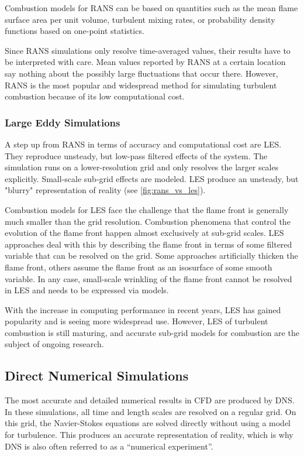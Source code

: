 %
Combustion models for \ac{RANS} can be based on quantities such as the mean
flame surface area per unit volume, turbulent mixing rates, or probability
density functions based on one-point statistics.
%

%
Since \ac{RANS} simulations only resolve time-averaged values, their results
have to be interpreted with care.
%
Mean values reported by \ac{RANS} at a certain location say nothing about the
possibly large fluctuations that occur there.
%
However, \ac{RANS} is the most popular and widespread method for simulating
turbulent combustion because of its low computational cost.
%
%
\subsubsection{Large Eddy Simulations} %
\label{ssub:les}
%
A step up from \ac{RANS} in terms of accuracy and computational cost are
\ac{LES}.
%
They reproduce unsteady, but low-pass filtered effects of the system.
%
The simulation runs on a lower-resolution grid and only resolves the larger
scales explicitly.
%
Small-scale sub-grid effects are modeled.
%
\ac{LES} produce an unsteady, but "blurry" representation of reality (see
\cref{fig:rans_vs_les}).
%

%
Combustion models for \ac{LES} face the challenge that the flame front is
generally much smaller than the grid resolution.
%
Combustion phenomena that control the evolution of the flame front happen almost
exclusively at sub-grid scales.
%
\ac{LES} approaches deal with this by describing the flame front in terms of
some filtered variable that can be resolved on the grid.
%
Some approaches artificially thicken the flame front, others assume the
flame front as an isosurface of some smooth variable.
%
In any case, small-scale wrinkling of the flame front cannot be resolved in
\ac{LES} and needs to be expressed via models.
%

%
With the increase in computing performance in recent years, \ac{LES} has gained
popularity and is seeing more widespread use.
%
However, \ac{LES} of turbulent combustion is still maturing, and accurate
sub-grid models for combustion are the subject of ongoing research.
%
%
%
\subsection{Direct Numerical Simulations} %
\label{sub:direct_numerical_simulations}
%
The most accurate and detailed numerical results in \ac{CFD} are produced by
\ac{DNS}.
%
In these simulations, all time and length scales are resolved on a regular grid.
%
On this grid, the Navier-Stokes equations are solved directly without using a
model for turbulence.
%
This produces an accurate representation of reality, which is why \ac{DNS} is
also often referred to as a ``numerical experiment''.
%

